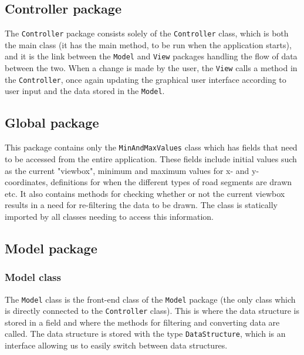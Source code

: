 \documentclass[a4paper,11pt]{article}
\begin{document}
\subsection{Controller package} %
The \texttt{Controller} package consists solely of the \texttt{Controller} class, which is both the main class (it has the main method, to be run when the application starts), and it is the link between the \texttt{Model} and \texttt{View} packages handling the flow of data between the two. When a change is made by the user, the \texttt{View} calls a method in the \texttt{Controller}, once again updating the graphical user interface according to user input and the data stored in the \texttt{Model}.

\subsection{Global package} %
This package contains only the \texttt{MinAndMaxValues} class which has fields that need to be accessed from the entire application. These fields include initial values such as the current "viewbox", minimum and maximum values for x- and y-coordinates, definitions for when the different types of road segments are drawn etc. It also contains methods for checking whether or not the current viewbox results in a need for re-filtering the data to be drawn. The class is statically imported by all classes needing to access this information.

\subsection{Model package} %

\subsubsection{Model class} %
The \texttt{Model} class is the front-end class of the \texttt{Model} package (the only class which is directly connected to the \texttt{Controller} class). This is where the data structure is stored in a field and where the methods for filtering and converting data are called. The data structure is stored with the type \texttt{DataStructure}, which is an interface allowing us to easily switch between data structures.
\end{document}
